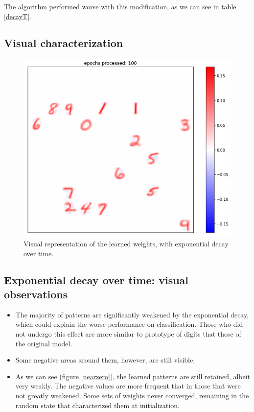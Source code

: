 \documentclass[a4paper]{report}
\begin{document}
The algorithm performed worse with this modification, as we can see in table \ref{decayT}.

\subsection{Visual characterization}

\begin{figure} [H]
\centering
\includegraphics [width=12cm ] {h/cento.png}
\caption{Visual representation of the learned weights, with exponential decay over time.}
\end{figure}

\subsection{Exponential decay over time: visual observations}

\begin{itemize}
    \item The majority of patterns are significantly weakened by the exponential decay, which could explain the worse performance on classification. Those who did not undergo this effect are more similar to prototype of digits that those of the original model.
    \item Some negative areas around them, however, are still visible.
    \item As we can see (figure \ref{nearzero}), the learned patterns are still retained, albeit very weakly. The negative values are more frequent that in those that were not greatly weakened. Some sets of weights never converged, remaining in the random state that characterized them at initialization.
\end{itemize}
\end{document}
